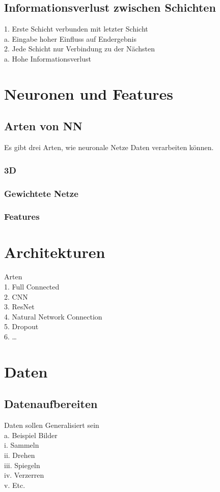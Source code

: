 \documentclass[12pt,oneside,a4paper,parskip]{scrbook}
\begin{document}
\subsection{Informationsverlust zwischen Schichten}
1.	Erste Schicht verbunden mit letzter Schicht\\
	a.	Eingabe hoher Einfluss auf Endergebnis\\
2.	Jede Schicht nur Verbindung zu der Nächsten\\
	a.	Hohe Informationsverlust\\

\section{Neuronen und Features}
\subsection{Arten von NN}
Es gibt drei Arten, wie neuronale Netze Daten verarbeiten können.
\subsubsection{3D}
\subsubsection{Gewichtete Netze}
\subsubsection{Features}

\section{Architekturen}
Arten
\\1.	Full Connected
\\2.	CNN
\\3.	ResNet
\\4.	Natural Network Connection
\\5.	Dropout
\\6.	…

\section{Daten}
\subsection{Datenaufbereiten}
Daten sollen Generalisiert sein	\\
	a.	Beispiel Bilder \\
		i.	Sammeln \\
		ii.	Drehen\\
		iii.	Spiegeln\\
		iv.	Verzerren\\
		v.	Etc.\\
\end{document}
